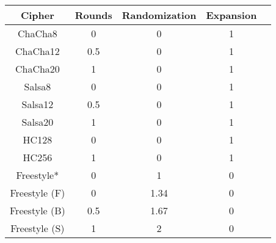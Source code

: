 \begin{table}[t]
    \begin{center}
        \small
        \centering
        \begin{tabular}{@{}c|cccc@{}}
            \textbf{Cipher} & \textbf{Rounds} & \textbf{Randomization} & \textbf{Expansion} \\
            \midrule
            ChaCha8         & 0           & 0           & 1           \\
            ChaCha12        & 0.5         & 0           & 1           \\
            ChaCha20        & 1           & 0           & 1           \\
            Salsa8          & 0           & 0           & 1           \\
            Salsa12         & 0.5         & 0           & 1           \\
            Salsa20         & 1           & 0           & 1           \\
            HC128           & 0           & 0           & 1           \\
            HC256           & 1           & 0           & 1           \\
            Freestyle*      & 0           & 1           & 0           \\
            Freestyle (F)   & 0           & 1.34        & 0           \\
            Freestyle (B)   & 0.5         & 1.67        & 0           \\
            Freestyle (S)   & 1           & 2           & 0           \\
        \end{tabular}
    \end{center}

\end{table}

